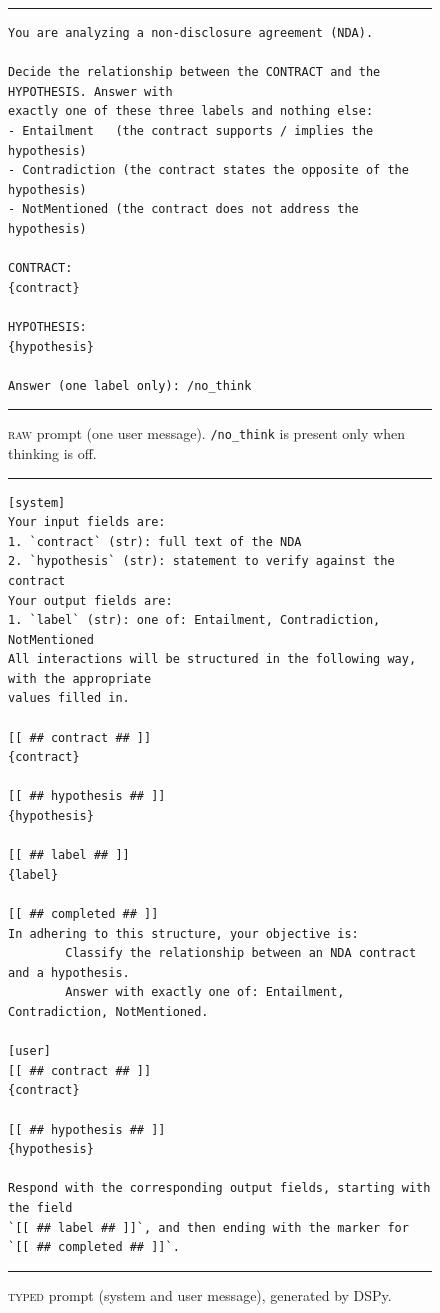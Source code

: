 \documentclass[11pt]{article}
\newcommand{\typed}{\textsc{typed}}
\begin{document}
\begin{figure}[H]
\centering
\begin{minipage}{0.92\textwidth}
\footnotesize
\hrule\vspace{4pt}
\begin{verbatim}
You are analyzing a non-disclosure agreement (NDA).

Decide the relationship between the CONTRACT and the HYPOTHESIS. Answer with
exactly one of these three labels and nothing else:
- Entailment   (the contract supports / implies the hypothesis)
- Contradiction (the contract states the opposite of the hypothesis)
- NotMentioned (the contract does not address the hypothesis)

CONTRACT:
{contract}

HYPOTHESIS:
{hypothesis}

Answer (one label only): /no_think
\end{verbatim}
\vspace{2pt}\hrule
\end{minipage}
\caption{\textsc{raw} prompt (one user message). \texttt{/no\_think} is
present only when thinking is off.}
\label{fig:prompt_raw}
\end{figure}

\begin{figure}[H]
\centering
\begin{minipage}{0.92\textwidth}
\footnotesize
\hrule\vspace{4pt}
\begin{verbatim}
[system]
Your input fields are:
1. `contract` (str): full text of the NDA
2. `hypothesis` (str): statement to verify against the contract
Your output fields are:
1. `label` (str): one of: Entailment, Contradiction, NotMentioned
All interactions will be structured in the following way, with the appropriate
values filled in.

[[ ## contract ## ]]
{contract}

[[ ## hypothesis ## ]]
{hypothesis}

[[ ## label ## ]]
{label}

[[ ## completed ## ]]
In adhering to this structure, your objective is:
        Classify the relationship between an NDA contract and a hypothesis.
        Answer with exactly one of: Entailment, Contradiction, NotMentioned.

[user]
[[ ## contract ## ]]
{contract}

[[ ## hypothesis ## ]]
{hypothesis}

Respond with the corresponding output fields, starting with the field
`[[ ## label ## ]]`, and then ending with the marker for `[[ ## completed ## ]]`.
\end{verbatim}
\vspace{2pt}\hrule
\end{minipage}
\caption{\typed{} prompt (system and user message), generated by DSPy.}
\label{fig:prompt_typed}
\end{figure}
\end{document}
